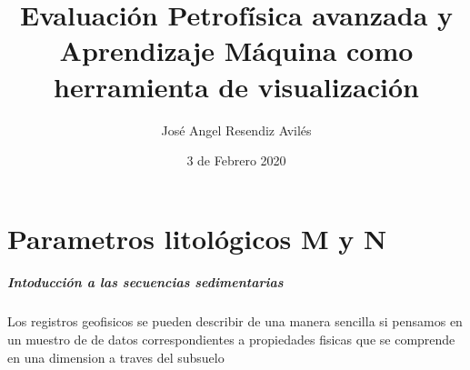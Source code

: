 \documentclass[12pt]{book}
\begin{document}
    
\title{Evaluación Petrofísica avanzada y Aprendizaje Máquina como herramienta de visualización}
\author{José Angel Resendiz Avilés}
\date{3 de Febrero 2020}
\maketitle

\chapter{Parametros litológicos M y N}

\paragraph{Intoducción a las secuencias sedimentarias}

\textnormal{Los registros geofisicos se pueden describir de una manera sencilla si pensamos en un muestro de de datos correspondientes a propiedades fisicas que se comprende en una dimension a traves del subsuelo}
\end{document}

